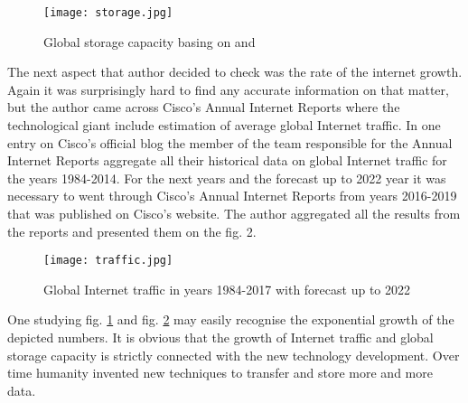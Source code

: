 \documentclass[magisterska,en]{pracamgr}
\begin{document}
\begin{figure}[h]
    \centering
    \texttt{[image: storage.jpg]}
    \caption{Global storage capacity basing on \cite{Storage_study1} and \cite{IDC_press}}
    \label{fig:storage}
\end{figure}

The next aspect that author decided to check was the rate of the internet growth. Again it was surprisingly hard to find any accurate information on that matter, but the author came across Cisco's Annual Internet Reports where the technological giant include estimation of average global Internet traffic. In one entry on Cisco's official blog the member of the team responsible for the Annual Internet Reports aggregate all their historical data on global Internet traffic for the years 1984-2014. \cite{Cisco_blog} For the next years and the forecast up to 2022 year it was necessary to went through Cisco's Annual Internet Reports from years 2016-2019 that was published on Cisco's website. \cite{Cisco_VNI} The author aggregated all the results from the reports and presented them on the fig. 2.

\begin{figure}[h]
    \centering
    \texttt{[image: traffic.jpg]}
    \caption{Global Internet traffic in years 1984-2017 with forecast up to 2022}
    \label{fig:traffic}
\end{figure}

One studying fig. \ref{fig:storage} and fig. \ref{fig:traffic} may easily recognise the exponential growth of the depicted numbers. It is obvious that the growth of Internet traffic and global storage capacity is strictly connected with the new technology development. Over time humanity invented new techniques to transfer and store more and more data.
\end{document}

